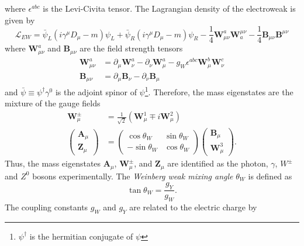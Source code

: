 %
where $\epsilon^{abc}$ is the Levi-Civita tensor.
The Lagrangian density of the electroweak is given by
%
\begin{equation}
    \mathcal{L}_{EW} = \bar{\psi}_{L} (i \gamma^{\mu} D_{\mu} - m) \psi_{L} + \bar{\psi}_{R} (i \gamma^{\mu} D_{\mu} - m) \psi_{R} - \frac{1}{4} \bm{W}_{\mu\nu}^{a} \bm{W}_{a}^{\mu\nu} - \frac{1}{4} \bm{B}_{\mu\nu} \bm{B}^{\mu\nu}
    \label{eq:sm_Lagrangian_ew}
\end{equation}
%
where $\bm{W}_{\mu\nu}^{a}$ and $\bm{B}_{\mu\nu}$ are the field strength tensors
%
\begin{align}
    \bm{W}_{\mu\nu}^{a} & = \partial_{\mu} \bm{W}_{\nu}^{a} - \partial_{\nu} \bm{W}_{\mu}^{a} - g_{W} \epsilon^{abc} \bm{W}_{\mu}^{b} \bm{W}_{\nu}^{c}\\
    \bm{B}_{\mu\nu} & = \partial_{\mu} \bm{B}_{\nu} - \partial_{\nu} \bm{B}_{\mu}
    \label{eq:sm_field_strangth_tensors}
\end{align}
%
and $\bar{\psi} \equiv \psi^{\dagger} \gamma^{0}$ is the adjoint spinor of $\psi$\footnote{$\psi^{\dagger}$ is the hermitian conjugate of $\psi$}.
Therefore, the mass eigenstates are the mixture of the gauge fields
%
\begin{align}
    \bm{W}_{\mu}^{\pm} & = \frac{1}{\sqrt{2}} (\bm{W}_{\mu}^{1} \mp i \bm{W}_{\mu}^{2})\\
    \left(\begin{matrix}\bm{A}_{\mu}\\\bm{Z}_{\mu}\end{matrix}\right) & = \left(\begin{matrix}\cos\theta_{W} & \sin\theta_{W}\\-\sin\theta_{W} & \cos\theta_{W} \end{matrix}\right) \left(\begin{matrix}\bm{B}_{\mu}\\\bm{W}_{\mu}^{3}\end{matrix}\right).
    \label{eq:sm_mass_eigenstates}
\end{align}
%
Thus, the mass eigenstates $\bm{A}_{\mu}$, $\bm{W}_{\mu}^{\pm}$, and $\bm{Z}_{\mu}$ are identified as the photon, $\gamma$, $W^{\pm}$ and $Z^{0}$ bosons experimentally.
The \textit{Weinberg weak mixing angle} $\theta_{W}$ is defined as
%
\begin{equation}
    \tan \theta_{W} = \frac{g_{Y}}{g_{W}}.
    \label{eq:sm_mixing_angle}
\end{equation}
%
The coupling constants $g_{W}$ and $g_{Y}$ are related to the electric charge by
